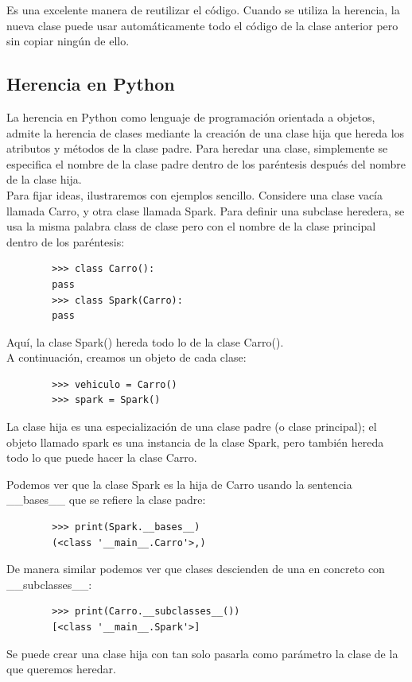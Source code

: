 {{	
	Es una excelente manera de reutilizar el código. Cuando se utiliza la herencia, la nueva clase puede usar automáticamente todo el código de la clase anterior pero sin copiar ningún de ello.
	
	\subsection{Herencia en Python}
	
	La herencia en Python como lenguaje de programación orientada a objetos, admite la herencia de clases mediante la creación de una clase hija que hereda los atributos y métodos de la clase padre. 
	Para heredar una clase, simplemente se especifica el nombre de la clase padre dentro de los paréntesis después del nombre de la clase hija.\\
	
	Para fijar ideas, ilustraremos con ejemplos sencillo. Considere una clase vacía llamada  {\ttfamily Carro}, y  otra clase llamada {\ttfamily Spark}. Para definir una subclase heredera, se usa la misma palabra {\ttfamily class} de clase pero con el nombre de la clase principal dentro de los paréntesis:
	
	\begin{lstlisting}
		>>> class Carro():
		pass
		>>> class Spark(Carro):
		pass	
	\end{lstlisting}
	Aquí, la clase {\ttfamily Spark()} hereda todo lo de la clase  {\ttfamily Carro()}.\\
	
	A continuación, creamos un objeto de cada clase:
	
	\begin{lstlisting}
		>>> vehiculo = Carro()
		>>> spark = Spark()
	\end{lstlisting}
	
	La clase hija es una especialización de una clase padre (o clase principal); el objeto llamado {\ttfamily spark} es una instancia de la clase {\ttfamily Spark}, pero también hereda todo lo que puede hacer la clase {\ttfamily Carro}. 
	
	
	Podemos ver que la clase {\ttfamily Spark} es la hija de  {\ttfamily Carro} usando la sentencia  {\ttfamily\_\!\_bases\_\!\_} que se refiere la clase padre:
	
	\begin{lstlisting}
		>>> print(Spark.__bases__)
		(<class '__main__.Carro'>,)
	\end{lstlisting} 
	De manera similar podemos ver que clases descienden de una en concreto con {\ttfamily\_\!\_subclasses\_\!\_}:
	\begin{lstlisting}
		>>> print(Carro.__subclasses__())
		[<class '__main__.Spark'>]
	\end{lstlisting} 
	Se puede crear una clase hija con tan solo pasarla como parámetro la clase de la que queremos heredar. \\
	
}}

